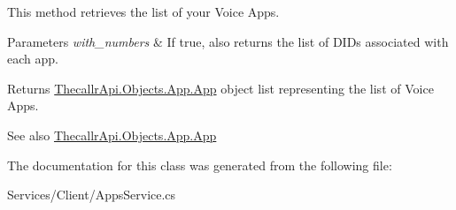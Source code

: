 This method retrieves the list of your Voice Apps. 


\begin{DoxyParams}{Parameters}
{\em with\+\_\+numbers} & If {\ttfamily true}, also returns the list of D\+I\+Ds associated with each app.\\
\hline
\end{DoxyParams}
\begin{DoxyReturn}{Returns}
\hyperlink{class_thecallr_api_1_1_objects_1_1_app_1_1_app}{Thecallr\+Api.\+Objects.\+App.\+App} object list representing the list of Voice Apps.
\end{DoxyReturn}
\begin{DoxySeeAlso}{See also}
\hyperlink{class_thecallr_api_1_1_objects_1_1_app_1_1_app}{Thecallr\+Api.\+Objects.\+App.\+App}


\end{DoxySeeAlso}


The documentation for this class was generated from the following file\+:\begin{DoxyCompactItemize}
\item 
Services/\+Client/Apps\+Service.\+cs\end{DoxyCompactItemize}
